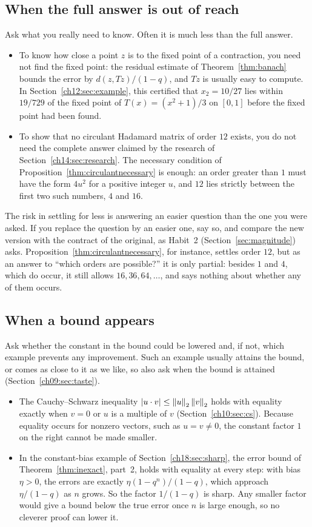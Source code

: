 \subsection*{When the full answer is out of reach}
Ask what you really need to know. Often it is much less than the full answer.
\begin{itemize}
\item To know how close a point $z$ is to the fixed point of a contraction, you need not find the fixed point: the residual estimate of Theorem~\ref{thm:banach} bounds the error by $d(z,Tz)/(1-q)$, and $Tz$ is usually easy to compute. In Section~\ref{ch12:sec:example}, this certified that $x_2=10/27$ lies within $19/729$ of the fixed point of $T(x)=(x^2+1)/3$ on $[0,1]$ before the fixed point had been found.
\item To show that no circulant Hadamard matrix of order $12$ exists, you do not need the complete answer claimed by the research of Section~\ref{ch14:sec:research}. The necessary condition of Proposition~\ref{thm:circulantnecessary} is enough: an order greater than $1$ must have the form $4u^2$ for a positive integer $u$, and $12$ lies strictly between the first two such numbers, $4$ and $16$.
\end{itemize}
The risk in settling for less is answering an easier question than the one you were asked. If you replace the question by an easier one, say so, and compare the new version with the contract of the original, as Habit~2 (Section~\ref{sec:magnitude}) asks. Proposition~\ref{thm:circulantnecessary}, for instance, settles order $12$, but as an answer to ``which orders are possible?'' it is only partial: besides $1$ and $4$, which do occur, it still allows $16,36,64,\ldots$, and says nothing about whether any of them occurs.

\subsection*{When a bound appears}
Ask whether the constant in the bound could be lowered and, if not, which example prevents any improvement. Such an example usually attains the bound, or comes as close to it as we like, so also ask when the bound is attained (Section~\ref{ch09:sec:taste}).
\begin{itemize}
\item The Cauchy--Schwarz inequality $|u\cdot v|\le\left\|u\right\|_2\left\|v\right\|_2$ holds with equality exactly when $v=0$ or $u$ is a multiple of $v$ (Section~\ref{ch10:sec:cs}). Because equality occurs for nonzero vectors, such as $u=v\ne0$, the constant factor $1$ on the right cannot be made smaller.
\item In the constant-bias example of Section~\ref{ch18:sec:sharp}, the error bound of Theorem~\ref{thm:inexact}, part~2, holds with equality at every step: with bias $\eta>0$, the errors are exactly $\eta(1-q^n)/(1-q)$, which approach $\eta/(1-q)$ as $n$ grows. So the factor $1/(1-q)$ is sharp. Any smaller factor would give a bound below the true error once $n$ is large enough, so no cleverer proof can lower it.
\end{itemize}
